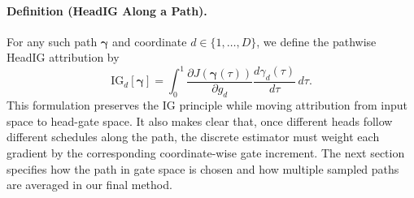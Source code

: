 \paragraph{Definition (HeadIG Along a Path).}
For any such path $\boldsymbol{\gamma}$ and coordinate $d\in\{1,\dots,D\}$, we define the pathwise HeadIG attribution by
\begin{equation}
    \mathrm{IG}_{d}[\boldsymbol{\gamma}]
    =
    \int_{0}^{1}
    \frac{\partial J(\boldsymbol{\gamma}(\tau))}{\partial g_d}
    \frac{d\gamma_d(\tau)}{d\tau}\, d\tau.
    \label{eq:ig_general}
\end{equation}
This formulation preserves the IG principle while moving attribution from input space to head-gate space. It also makes clear that, once different heads follow different schedules along the path, the discrete estimator must weight each gradient by the corresponding coordinate-wise gate increment. The next section specifies how the path in gate space is chosen and how multiple sampled paths are averaged in our final method.